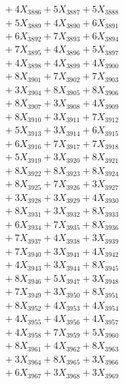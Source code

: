 \documentclass[a4paper,10pt]{article}
\begin{document}
{\begin{align}
&\;  + 4 X_{3886} + 5 X_{3887} + 5 X_{3888} \\[0.3ex]
&\;  + 5 X_{3889} + 4 X_{3890} + 6 X_{3891} \\[0.3ex]
&\;  + 6 X_{3892} + 7 X_{3893} + 6 X_{3894} \\[0.3ex]
&\;  + 7 X_{3895} + 4 X_{3896} + 5 X_{3897} \\[0.3ex]
&\;  + 4 X_{3898} + 4 X_{3899} + 4 X_{3900} \\[0.3ex]
&\;  + 8 X_{3901} + 7 X_{3902} + 7 X_{3903} \\[0.3ex]
&\;  + 3 X_{3904} + 8 X_{3905} + 8 X_{3906} \\[0.3ex]
&\;  + 8 X_{3907} + 3 X_{3908} + 4 X_{3909} \\[0.5ex]\allowbreak
&\;  + 8 X_{3910} + 3 X_{3911} + 7 X_{3912} \\[0.3ex]
&\;  + 5 X_{3913} + 3 X_{3914} + 6 X_{3915} \\[0.3ex]
&\;  + 6 X_{3916} + 7 X_{3917} + 7 X_{3918} \\[0.3ex]
&\;  + 5 X_{3919} + 3 X_{3920} + 8 X_{3921} \\[0.3ex]
&\;  + 8 X_{3922} + 8 X_{3923} + 8 X_{3924} \\[0.3ex]
&\;  + 8 X_{3925} + 7 X_{3926} + 3 X_{3927} \\[0.3ex]
&\;  + 3 X_{3928} + 3 X_{3929} + 4 X_{3930} \\[0.3ex]
&\;  + 8 X_{3931} + 3 X_{3932} + 8 X_{3933} \\[0.3ex]
&\;  + 6 X_{3934} + 7 X_{3935} + 8 X_{3936} \\[0.3ex]
&\;  + 7 X_{3937} + 4 X_{3938} + 3 X_{3939} \\[0.5ex]\allowbreak
&\;  + 7 X_{3940} + 3 X_{3941} + 4 X_{3942} \\[0.3ex]
&\;  + 4 X_{3943} + 3 X_{3944} + 8 X_{3945} \\[0.3ex]
&\;  + 8 X_{3946} + 5 X_{3947} + 3 X_{3948} \\[0.3ex]
&\;  + 7 X_{3949} + 3 X_{3950} + 8 X_{3951} \\[0.3ex]
&\;  + 8 X_{3952} + 4 X_{3953} + 4 X_{3954} \\[0.3ex]
&\;  + 4 X_{3955} + 4 X_{3956} + 4 X_{3957} \\[0.3ex]
&\;  + 4 X_{3958} + 7 X_{3959} + 5 X_{3960} \\[0.3ex]
&\;  + 8 X_{3961} + 4 X_{3962} + 8 X_{3963} \\[0.3ex]
&\;  + 3 X_{3964} + 8 X_{3965} + 3 X_{3966} \\[0.3ex]
&\;  + 6 X_{3967} + 3 X_{3968} + 3 X_{3969} \\[0.5ex]\allowbreak

\end{align}}
\end{document}
